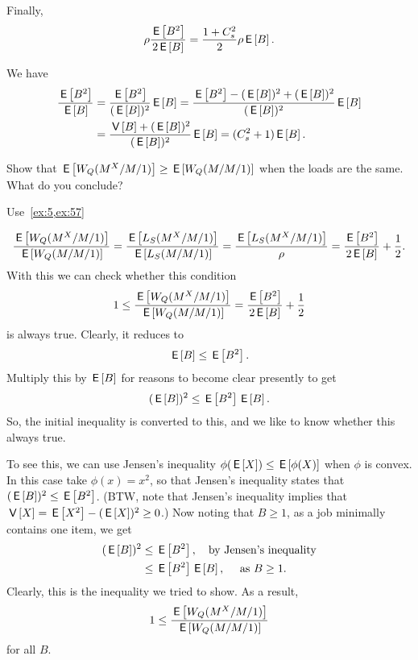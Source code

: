 \begin{extra}\label{q:batch}
Finally, 
\begin{equation*}
\rho  \frac{\E{B^2}}{2\E{B}} = \frac{1+C_s^2}{2} \rho \E B.
\end{equation*}
\begin{solution}
We have
\begin{align*}
  \frac{\E{B^2}}{\E{B}}
&=    \frac{\E{B^2}}{(\E B)^2} \E B 
=    \frac{\E{B^2} - (\E B)^2 + (\E B)^2}{(\E B)^2} \E B  \\
&= \frac{\V B + (\E B)^2}{(\E B)^2}\E B = (C_s^2+1)\E B.
\end{align*}
\end{solution}
\end{extra}


\begin{exercise}
  Show that $\E{W_Q(M^X/M/1)} \geq \E{W_Q(M/M/1)}$ when the loads are the same.
  What do you conclude?
\begin{hint}
Use~\cref{ex:5,ex:57}
\end{hint}
\begin{solution}
    \begin{equation*}
    \frac{\E{W_Q(M^X/M/1)}}{\E{W_Q(M/M/1)}} = \frac{\E{L_S(M^X/M/1)}}{\E{L_S(M/M/1)}} = \frac{\E{L_S(M^X/M/1)}}{\rho} = 
\frac{\E{B^2}}{2\E B} + \frac 12.
    \end{equation*}
With this we can check whether this condition
    \begin{equation*}
    1\leq \frac{\E{W_Q(M^X/M/1)}}{\E{W_Q(M/M/1)}} = \frac{\E{B^2}}{2\E B} + \frac 12
    \end{equation*}
    is always true. Clearly, it reduces to
\begin{equation*}
\E B \leq  \E{B^2}.
\end{equation*}
Multiply this by $\E B$ for reasons to become clear presently to get
\begin{equation*}
(\E B)^2 \leq  \E{B^2} \E B.
\end{equation*}
So, the initial inequality is converted to this, and we like to know
whether this always true.


To see this, we can use Jensen's inequality $\phi(\E X) \leq \E{\phi(X)}$ when $\phi$ is convex.
In this case take $\phi(x)=x^2$, so that Jensen's inequality states that $(\E B)^2 \leq \E{B^2}$.
(BTW, note that Jensen's inequality implies that $\V X = \E{X^2} - (\E X)^2\geq 0$.)
Now noting that $B\geq 1$, as a job minimally contains one item, we get
\begin{equation*}
  \begin{split}
(\E B)^2 
&\leq  \E{B^2}, \quad{\text{by Jensen's inequality}} \\
&\leq   \E{B^2} \E B, \quad{\text{ as } B \geq 1}.
  \end{split}
\end{equation*}
Clearly, this is the inequality we tried to show. As a result,
    \begin{equation*}
    1\leq \frac{\E{W_Q(M^X/M/1)}}{\E{W_Q(M/M/1)}}
    \end{equation*}
for all $B$. 


\end{solution}
\end{exercise}
